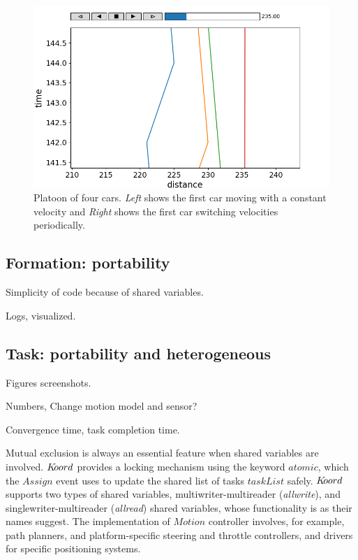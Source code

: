 \begin{figure}[h!]
\includegraphics[scale=0.3]{figs/unsafe_braking.png}
	\caption{\small {Platoon of four cars. \emph{Left} shows the first car moving with a constant velocity} and \emph{Right} shows the first car switching velocities periodically.}
\label{fig:unsafeplatoon}
\end{figure}

\subsection{Formation: portability}
\label{sec:formation}

Simplicity of code because of shared variables.

Logs, visualized.

\subsection{Task: portability and heterogeneous}

Figures screenshots. 

Numbers, Change motion model and sensor? 


Convergence time, task completion time.



Mutual exclusion is always an essential feature when shared variables are involved. $K\kern-2pt oord$ provides a locking mechanism using the keyword $\mathit{atomic}$, which the $\mathit{Assign}$ event uses to update the shared list of tasks $\mathit{taskList}$ safely. $K\kern-2pt oord$ supports two types of shared variables, multiwriter-multireader (\emph{allwrite}), and singlewriter-multireader (\emph{allread}) shared variables, whose functionality is as their names suggest. 
The implementation of $\mathit{Motion}$ controller involves, for example, path planners, and platform-specific steering and throttle controllers, and drivers for specific positioning systems. 

